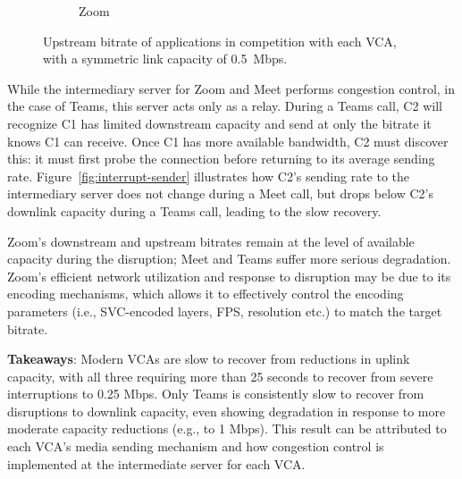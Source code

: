 \begin{figure}[t!]
\begin{subfigure}[t]{.33\textwidth}
        \caption{Zoom}
        \label{fig:zoom_ul_box}
    \end{subfigure}
    \caption{Upstream bitrate of applications in competition with each VCA, with a symmetric link capacity of 0.5~Mbps.}
    \label{fig:boxplot-upld}
\end{figure}

While the intermediary server for Zoom and Meet performs congestion control,
in the case of Teams, this server acts only as a relay. During a
Teams call, C2 will recognize C1 has limited downstream capacity and 
send at only the bitrate it knows C1 can receive.
Once C1 has more available bandwidth, C2 must discover this: it must first
probe the connection before returning to its average sending rate.
Figure~\ref{fig:interrupt-sender} illustrates how C2's sending rate to the intermediary server does not
change during a Meet call, but drops below C2's downlink capacity during a
Teams call, leading to the slow recovery.

Zoom's downstream and upstream bitrates remain at the level of available
capacity during the disruption; Meet and Teams suffer more
serious degradation. Zoom's efficient network utilization and response to
disruption may be due to its encoding mechanisms, which allows it to  
effectively control the encoding parameters (i.e., SVC-encoded layers, FPS,
resolution etc.) to match the target bitrate.  
\vspace{10pt}
\begin{mdframed}[roundcorner=5pt, backgroundcolor=black!10] \noindent
    \textbf{Takeaways}: Modern VCAs are slow to recover from reductions in uplink 
    capacity, with all three requiring more than 25 seconds to recover from severe
    interruptions to 0.25 Mbps. Only Teams is consistently slow to recover
    from disruptions to downlink capacity, even showing degradation in
    response to more moderate capacity reductions (e.g., to 1 Mbps).
    This result can be attributed to each VCA's media sending mechanism and how
    congestion control is implemented at the intermediate server for each VCA. 
\end{mdframed}


